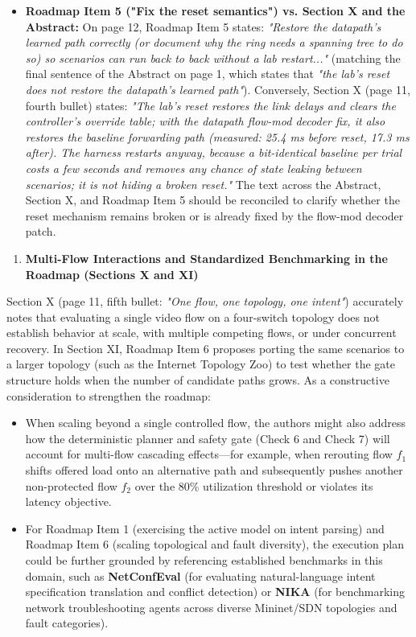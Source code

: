 \documentclass[11pt,a4paper]{article}
\begin{document}
\begin{itemize}[leftmargin=1.8em,itemsep=2pt]
\item \textbf{Roadmap Item 5 ("Fix the reset semantics") vs. Section X and the Abstract:} On page 12, Roadmap Item 5 states: \emph{"Restore the datapath's learned path correctly (or document why the ring needs a spanning tree to do so) so scenarios can run back to back without a lab restart..."} (matching the final sentence of the Abstract on page 1, which states that \emph{"the lab's reset does not restore the datapath's learned path"}). Conversely, Section X (page 11, fourth bullet) states: \emph{"The lab's reset restores the link delays and clears the controller's override table; with the datapath flow-mod decoder fix, it also restores the baseline forwarding path (measured: 25.4 ms before reset, 17.3 ms after). The harness restarts anyway, because a bit-identical baseline per trial costs a few seconds and removes any chance of state leaking between scenarios; it is not hiding a broken reset."} The text across the Abstract, Section X, and Roadmap Item 5 should be reconciled to clarify whether the reset mechanism remains broken or is already fixed by the flow-mod decoder patch.
\end{itemize}
\begin{enumerate}[leftmargin=1.6em,itemsep=3pt]
\item \textbf{Multi-Flow Interactions and Standardized Benchmarking in the Roadmap (Sections X and XI)}
\end{enumerate}
Section X (page 11, fifth bullet: \emph{"One flow, one topology, one intent"}) accurately notes that evaluating a single video flow on a four-switch topology does not establish behavior at scale, with multiple competing flows, or under concurrent recovery. In Section XI, Roadmap Item 6 proposes porting the same scenarios to a larger topology (such as the Internet Topology Zoo) to test whether the gate structure holds when the number of candidate paths grows. As a constructive consideration to strengthen the roadmap:
\begin{itemize}[leftmargin=1.8em,itemsep=2pt]
\item When scaling beyond a single controlled flow, the authors might also address how the deterministic planner and safety gate (Check 6 and Check 7) will account for multi-flow cascading effects—for example, when rerouting flow $f_1$ shifts offered load onto an alternative path and subsequently pushes another non-protected flow $f_2$ over the 80\% utilization threshold or violates its latency objective.
\item For Roadmap Item 1 (exercising the active model on intent parsing) and Roadmap Item 6 (scaling topological and fault diversity), the execution plan could be further grounded by referencing established benchmarks in this domain, such as \textbf{NetConfEval} (for evaluating natural-language intent specification translation and conflict detection) or \textbf{NIKA} (for benchmarking network troubleshooting agents across diverse Mininet/SDN topologies and fault categories).
\end{itemize}
\end{document}
